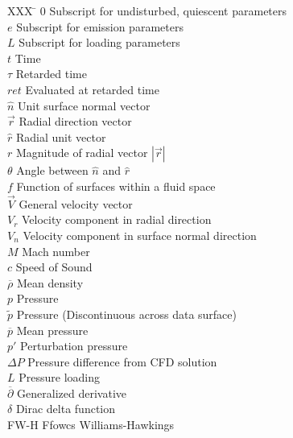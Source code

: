 \documentclass[]{aiaa-tc}%
\begin{document}
\begin{multicols}{2}
\begin{tabbing}
  XXX \= \kill%
  $0$                 \> Subscript for undisturbed, quiescent parameters \\
  $e$                 \> Subscript for emission parameters \\
  $L$                 \> Subscript for loading parameters \\
  $t$                 \> Time \\
  $\tau$              \> Retarded time \\
  $ret$               \> Evaluated at retarded time \\
  $\hat{n}$           \> Unit surface normal vector \\
  $\vec{r}$           \> Radial direction vector \\
  $\hat{r}$           \> Radial unit vector \\
  $r$                 \> Magnitude of radial vector $|\vec{r}|$ \\
  $\theta$            \> Angle between $\hat{n}$ and $\hat{r}$ \\
  $f$                 \> Function of surfaces within a fluid space \\
  $\vec{V}$           \> General velocity vector \\
  $V_r$               \> Velocity component in radial direction \\
  $V_n$               \> Velocity component in surface normal direction \\
  $M$                 \> Mach number \\
  $c$                 \> Speed of Sound\\
  $\overline{\rho}$   \> Mean density \\
  $p$                 \> Pressure  \\
  $\widetilde{p}$     \> Pressure (Discontinuous across data surface)  \\
  $\overline{p}$      \> Mean pressure \\
  $p'$                \> Perturbation pressure \\
  $\Delta P$          \> Pressure difference from CFD solution \\
  $L$                 \> Pressure loading \\
  $\overline{\partial}$ \> Generalized derivative \\
  $\delta$            \> Dirac delta function \\
  \scriptsize{FW-H}   \> Ffowcs Williams-Hawkings\\






\end{tabbing}

\end{multicols}
\end{document}

